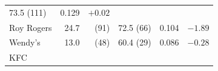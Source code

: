 \documentclass[11pt,a4paper,openany]{book}
\begin{document}
\begin{longtable}[]{@{}lrrrcc@{}}
\begin{minipage}[t]{0.29\columnwidth}
73.5 (111)\strut
\end{minipage} & \begin{minipage}[t]{0.10\columnwidth}\centering\strut
0.129\strut
\end{minipage} & \begin{minipage}[t]{0.08\columnwidth}\centering\strut
\(+0.02\)\strut
\end{minipage}\tabularnewline
\begin{minipage}[t]{0.26\columnwidth}\raggedright\strut
Roy Rogers\strut
\end{minipage} & \begin{minipage}[t]{0.04\columnwidth}\raggedleft\strut
24.7\strut
\end{minipage} & \begin{minipage}[t]{0.05\columnwidth}\raggedleft\strut
(91)\strut
\end{minipage} & \begin{minipage}[t]{0.29\columnwidth}\raggedleft\strut
72.5 (66)\strut
\end{minipage} & \begin{minipage}[t]{0.10\columnwidth}\centering\strut
0.104\strut
\end{minipage} & \begin{minipage}[t]{0.08\columnwidth}\centering\strut
\(-1.89\)\strut
\end{minipage}\tabularnewline
\begin{minipage}[t]{0.26\columnwidth}\raggedright\strut
Wendy's\strut
\end{minipage} & \begin{minipage}[t]{0.04\columnwidth}\raggedleft\strut
13.0\strut
\end{minipage} & \begin{minipage}[t]{0.05\columnwidth}\raggedleft\strut
(48)\strut
\end{minipage} & \begin{minipage}[t]{0.29\columnwidth}\raggedleft\strut
60.4 (29)\strut
\end{minipage} & \begin{minipage}[t]{0.10\columnwidth}\centering\strut
0.086\strut
\end{minipage} & \begin{minipage}[t]{0.08\columnwidth}\centering\strut
\(-0.28\)\strut
\end{minipage}\tabularnewline
\begin{minipage}[t]{0.26\columnwidth}\raggedright\strut
KFC\strut
\end{minipage} & \begin{minipage}[t]{0.04\columnwidth}\raggedleft\strut

\end{minipage}
\end{longtable}
\end{document}
